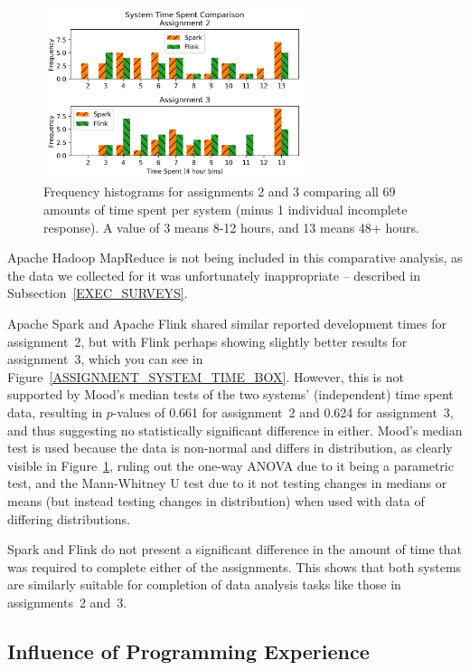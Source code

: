   \begin{figure}[ht]
    \centering
    \includegraphics[width=3in]{./figs/assignment-system-time-comparison-histogram.png}
    \caption{Frequency histograms for assignments 2 and 3 comparing all 69 amounts of time spent per system (minus 1 individual incomplete response). A value of 3 means 8-12 hours, and 13 means 48+ hours.}
    \label{ASSIGNMENT_SYSTEM_TIME_HIST}
  \end{figure}
  
  Apache Hadoop MapReduce is not being included in this comparative analysis, as the data we collected for it was unfortunately inappropriate -- described in Subsection~\ref{EXEC_SURVEYS}.

  Apache Spark and Apache Flink shared similar reported development times for assignment~2, but with Flink perhaps showing slightly better results for assignment~3, which you can see in Figure~\ref{ASSIGNMENT_SYSTEM_TIME_BOX}. However, this is not supported by Mood's median tests of the two systems' (independent) time spent data, resulting in $p$-values of 0.661 for assignment~2 and 0.624 for assignment~3, and thus suggesting no statistically significant difference in either. Mood's median test is used because the data is non-normal and differs in distribution, as clearly visible in Figure~\ref{ASSIGNMENT_SYSTEM_TIME_HIST}, ruling out the one-way ANOVA due to it being a parametric test, and the Mann-Whitney U test due to it not testing changes in medians or means (but instead testing changes in distribution) when used with data of differing distributions.

  Spark and Flink do not present a significant difference in the amount of time that was required to complete either of the assignments. This shows that both systems are similarly suitable for completion of data analysis tasks like those in assignments~2 and~3.


\subsection{Influence of Programming Experience}
\label{INF_PROG_EXP}
  
